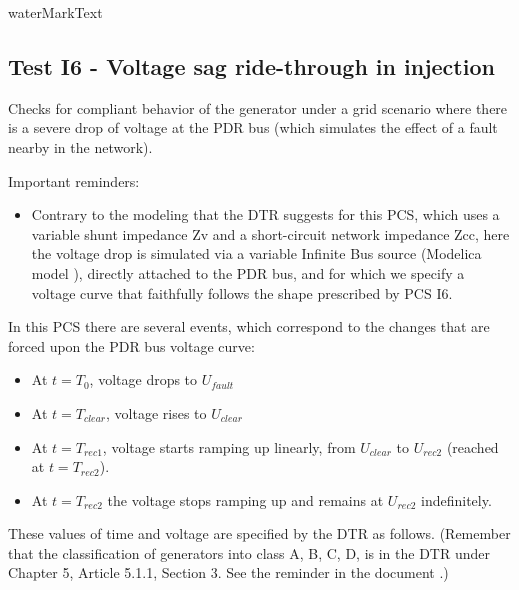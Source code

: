     {{ waterMarkText }}

    \renewcommand{\DTRPcs}{GridVoltageDip} %
    \renewcommand{\PCSname}{PCS_RTE-I16z3}
    \renewcommand{\OCname}{QzeroInjection}


    \subsection{Test I6 - Voltage sag ride-through in injection}

    Checks for compliant behavior of the generator under a grid scenario where there is a
    severe drop of voltage at the PDR bus (which simulates the effect of a fault
    nearby in the network).

    \GridCircuitZthree

    \noindent Important reminders:
    \begin{itemize}
        \item Contrary to the modeling that the DTR suggests for this PCS, which uses a
        variable shunt impedance Zv and a short-circuit network impedance Zcc, here
        the voltage drop is simulated via a variable Infinite Bus source (Modelica
        model ), directly attached to the PDR bus, and for
        which we specify a voltage curve that faithfully follows the shape prescribed
        by PCS I6.
    \end{itemize}

    In this PCS there are several events, which correspond to the changes that are
    forced upon the PDR bus voltage curve:
    \begin{itemize}
        \item At $t = T_{0}$, voltage drops to $U_{fault}$
        \item At $t = T_{clear}$, voltage rises to $U_{clear}$
        \item At $t = T_{rec1}$, voltage starts ramping up linearly, from $U_{clear}$ to
        $U_{rec2}$ (reached at $t = T_{rec2}$).
        \item At $t = T_{rec2}$ the voltage stops ramping up and remains at $U_{rec2}$
        indefinitely.
    \end{itemize}
    These values of time and voltage are specified by the DTR as follows. (Remember
    that the classification of generators into class A, B, C, D, is in the DTR under
    Chapter 5, Article 5.1.1, Section 3. See the reminder in the document
    .)

